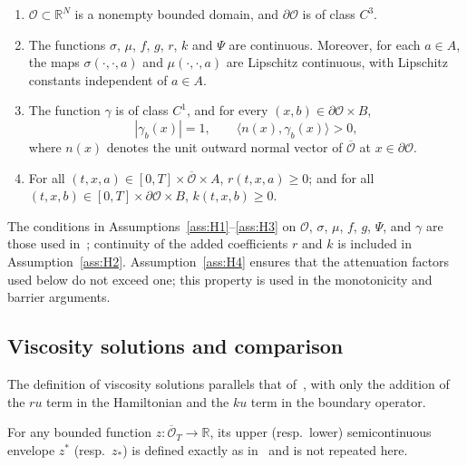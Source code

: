 \documentclass[10pt,a4paper]{amsart}
\newcommand{\R}{\mathbb{R}}
\newcommand{\cO}{\mathcal{O}}
\begin{document}
	
	\begin{enumerate}[
		label=\arabic*.,
		ref=\arabic*,
		labelsep=1em,
		leftmargin=*,
		itemindent=0pt
		]
		\item \label{ass:H1}
		$\mathcal{O}\subset\mathbb{R}^N$ is a nonempty bounded domain, and $\partial\mathcal{O}$ is of class $C^3$.
		
		\item \label{ass:H2}
		The functions $\sigma$, $\mu$, $f$, $g$, $r$, $k$ and $\Psi$ are continuous. Moreover, for each $a\in A$, the maps $\sigma(\cdot,\cdot,a)$ and $\mu(\cdot,\cdot,a)$ are Lipschitz continuous, with Lipschitz constants independent of $a\in A$.
		
		\item \label{ass:H3}
		The function $\gamma$ is of class $C^1$, and for every $(x,b)\in\partial\mathcal{O}\times B$,
		\begin{equation}
			|\gamma_b(x)|=1,\qquad \langle n(x),\gamma_b(x)\rangle > 0,
			\label{eq:gamma-cond}
		\end{equation}
		where $n(x)$ denotes the unit outward normal vector of $\overline{\mathcal{O}}$ at $x\in\partial\mathcal{O}$.
		
		\item \label{ass:H4}
		For all $(t,x,a)\in[0,T]\times\overline{\mathcal{O}}\times A$, $r(t,x,a)\ge 0$; and for all $(t,x,b)\in[0,T]\times\partial\mathcal{O}\times B$, $k(t,x,b)\ge 0$.
	\end{enumerate}
	The conditions in Assumptions~\ref{ass:H1}--\ref{ass:H3} on $\cO$, $\sigma$, $\mu$, $f$, $g$, $\Psi$, and $\gamma$ are those used in~\cite{CalzolaEtAl2023}; continuity of the added coefficients $r$ and $k$ is included in Assumption~\ref{ass:H2}.  Assumption~\ref{ass:H4} ensures that the attenuation factors used below do not exceed one; this property is used in the monotonicity and barrier arguments.
	
	
	\subsection{Viscosity solutions and comparison}
	
	The definition of viscosity solutions parallels that of~\cite{CalzolaEtAl2023}, with only the addition of the $ru$ term in the Hamiltonian and the $ku$ term in the boundary operator.
	
	For any bounded function $z:\overline{\cO}_T\to\R$, its upper (resp.\ lower) semicontinuous envelope $z^*$ (resp.\ $z_*$) is defined exactly as in~\cite{CalzolaEtAl2023} and is not repeated here.
	
\end{document}
